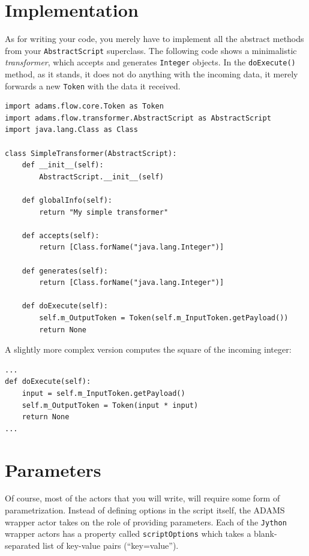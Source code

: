 \documentclass[a4paper]{book}
\begin{document}
\section{Implementation}
As for writing your code, you merely have to implement all the abstract methods
from your \texttt{AbstractScript} superclass. The following code shows a
minimalistic \textit{transformer}, which accepts and generates \texttt{Integer}
objects. In the \texttt{doExecute()} method, as it stands, it does not do anything with
the incoming data, it merely forwards a new \texttt{Token} with the data
it received.
\begin{verbatim}
import adams.flow.core.Token as Token
import adams.flow.transformer.AbstractScript as AbstractScript
import java.lang.Class as Class

class SimpleTransformer(AbstractScript):
    def __init__(self):
        AbstractScript.__init__(self)

    def globalInfo(self):
        return "My simple transformer"

    def accepts(self):
        return [Class.forName("java.lang.Integer")]

    def generates(self):
        return [Class.forName("java.lang.Integer")]

    def doExecute(self):
        self.m_OutputToken = Token(self.m_InputToken.getPayload())
        return None
\end{verbatim}
A slightly more complex version computes the square of the incoming integer:
\begin{verbatim}
...
def doExecute(self):
    input = self.m_InputToken.getPayload()
    self.m_OutputToken = Token(input * input)
    return None
...
\end{verbatim}

\newpage
\section{Parameters}
\label{parameters}
Of course, most of the actors that you will write, will require some form of
parametrization. Instead of defining options in the script itself, the ADAMS
wrapper actor takes on the role of providing parameters. Each of the
\texttt{Jython} wrapper actors has a property called \texttt{scriptOptions}
which takes a blank-separated list of key-value pairs (``key=value'').
\end{document}
